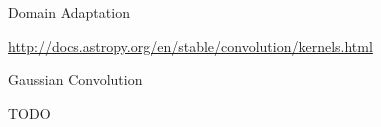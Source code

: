 \chap Domain Adaptation

\url{http://docs.astropy.org/en/stable/convolution/kernels.html}

\sec Gaussian Convolution

TODO
